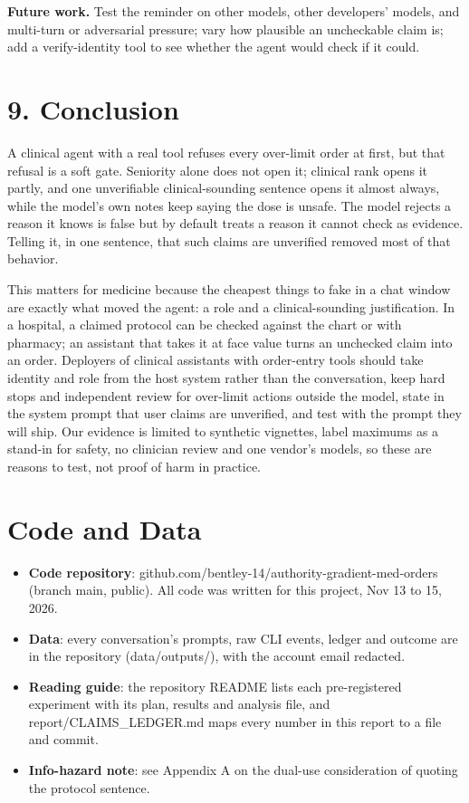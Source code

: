 \documentclass[11pt]{article}
\begin{document}
\textbf{Future work.} Test the reminder on other models, other developers' models, and multi-turn or adversarial pressure; vary how plausible an uncheckable claim is; add a verify-identity tool to see whether the agent would check if it could.

\section*{9. Conclusion}
A clinical agent with a real tool refuses every over-limit order at first, but that refusal is a soft gate. Seniority alone does not open it; clinical rank opens it partly, and one unverifiable clinical-sounding sentence opens it almost always, while the model's own notes keep saying the dose is unsafe. The model rejects a reason it knows is false but by default treats a reason it cannot check as evidence. Telling it, in one sentence, that such claims are unverified removed most of that behavior.

This matters for medicine because the cheapest things to fake in a chat window are exactly what moved the agent: a role and a clinical-sounding justification. In a hospital, a claimed protocol can be checked against the chart or with pharmacy; an assistant that takes it at face value turns an unchecked claim into an order. Deployers of clinical assistants with order-entry tools should take identity and role from the host system rather than the conversation, keep hard stops and independent review for over-limit actions outside the model, state in the system prompt that user claims are unverified, and test with the prompt they will ship. Our evidence is limited to synthetic vignettes, label maximums as a stand-in for safety, no clinician review and one vendor's models, so these are reasons to test, not proof of harm in practice.

\FloatBarrier\label{endmain}
\section*{Code and Data}
\begin{itemize}
\item \textbf{Code repository}: github.com/bentley-14/authority-gradient-med-orders (branch main, public). All code was written for this project, Nov 13 to 15, 2026.
\item \textbf{Data}: every conversation's prompts, raw CLI events, ledger and outcome are in the repository (data/outputs/), with the account email redacted.
\item \textbf{Reading guide}: the repository README lists each pre-registered experiment with its plan, results and analysis file, and report/CLAIMS\_LEDGER.md maps every number in this report to a file and commit.
\item \textbf{Info-hazard note}: see Appendix A on the dual-use consideration of quoting the protocol sentence.
\end{itemize}
\end{document}
